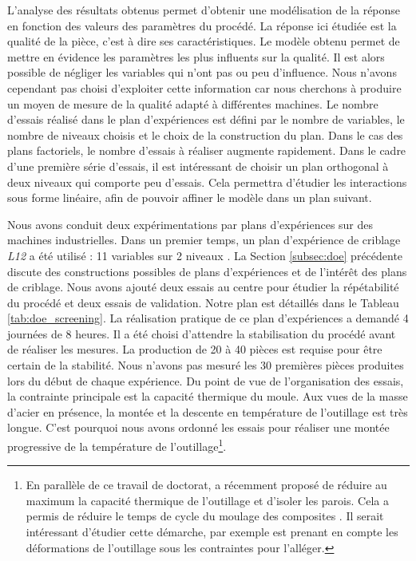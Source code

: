 L'analyse des résultats obtenus permet d'obtenir une modélisation de la réponse en fonction des valeurs des paramètres du procédé.
La réponse ici étudiée est la qualité de la pièce, c'est à dire ses caractéristiques.
Le modèle obtenu permet de mettre en évidence les paramètres les plus influents sur la qualité.
Il est alors possible de négliger les variables qui n'ont pas ou peu d'influence.
Nous n'avons cependant pas choisi d'exploiter cette information car nous cherchons à produire un moyen de mesure de la qualité adapté à différentes machines.
Le nombre d'essais réalisé dans le plan d'expériences est défini par le nombre de variables, le nombre de niveaux choisis et le choix de la construction du plan.
Dans le cas des plans factoriels, le nombre d'essais à réaliser augmente rapidement.
Dans le cadre d'une première série d'essais, il est intéressant de choisir un plan orthogonal à deux niveaux qui comporte peu d'essais.
Cela permettra d'étudier les interactions sous forme linéaire, afin de pouvoir affiner le modèle dans un plan suivant.

Nous avons conduit deux expérimentations par plans d'expériences sur des machines industrielles.
Dans un premier temps, un plan d'expérience de criblage \textit{L12} a été utilisé : 11 variables sur 2 niveaux \cite{plackett_design_1946}.
La Section \ref{subsec:doe} précédente discute des constructions possibles de plans d'expériences et de l'intérêt des plans de criblage.
Nous avons ajouté deux essais au centre pour étudier la répétabilité du procédé et deux essais de validation.
Notre plan est détaillés dans le Tableau \ref{tab:doe_screening}.
La réalisation pratique de ce plan d'expériences a demandé 4 journées de 8 heures.
Il a été choisi d'attendre la stabilisation du procédé avant de réaliser les mesures.
La production de 20 à 40 pièces est requise pour être certain de la stabilité.
Nous n'avons pas mesuré les 30 premières pièces produites lors du début de chaque expérience.
Du point de vue de l'organisation des essais, la contrainte principale est la capacité thermique du moule.
Aux vues de la masse d'acier en présence, la montée et la descente en température de l'outillage est très longue.
C'est pourquoi nous avons ordonné les essais pour réaliser une montée progressive de la température de l'outillage\footnote{En parallèle de ce travail de doctorat, \citeauthor{collomb_2018} a récemment proposé de réduire au maximum la capacité thermique de l'outillage et d'isoler les parois. Cela a permis de réduire le temps de cycle du moulage des composites \cite{collomb_2018}.
	Il serait intéressant d'étudier cette démarche, par exemple est prenant en compte les déformations de l'outillage sous les contraintes pour l'alléger.}.

